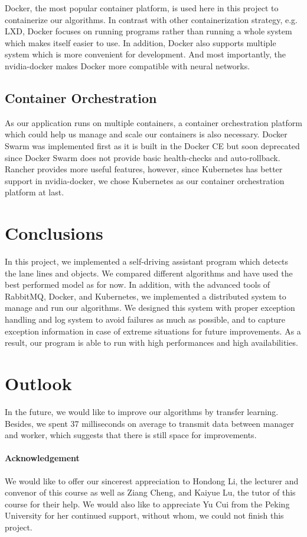 \documentclass[runningheads]{llncs}
\begin{document}
Docker, the most popular container platform, is used here 
in this project to containerize our algorithms. In contrast 
with other containerization strategy, e.g. LXD, Docker 
focuses on running programs rather than running a whole 
system which makes itself easier to use. In addition, 
Docker also supports multiple system which is more 
convenient for development. And most importantly, the 
nvidia-docker makes Docker more compatible with neural 
networks.

\subsection{Container Orchestration}
As our application runs on multiple containers, a container 
orchestration platform which could help us manage and scale 
our containers is also necessary. Docker Swarm was 
implemented first as it is built in the Docker CE but soon 
deprecated since Docker Swarm does not provide basic 
health-checks and auto-rollback. Rancher provides more 
useful features, however, since Kubernetes has better 
support in nvidia-docker, we chose Kubernetes as our 
container orchestration platform at last.


\section{Conclusions}
In this project, we implemented a self-driving assistant 
program which detects the lane lines and objects. We 
compared different algorithms and have used the best performed 
model as for now. In addition, with the advanced tools of 
RabbitMQ, Docker, and Kubernetes, we implemented a 
distributed system to manage and run our algorithms. We 
designed this system with proper exception handling and log 
system to avoid failures as much as possible, and to 
capture exception information in case of extreme situations 
for future improvements. As a result, our program is able 
to run with high performances and high availabilities. 

\section{Outlook}
In the future, we would like to improve our algorithms by 
transfer learning. Besides, we spent 37 milliseconds on 
average to transmit data between manager and worker, which 
suggests that there is still space for improvements. 

\paragraph{Acknowledgement}
We would like to offer our sincerest appreciation to 
Hondong Li, the lecturer and convenor of this course as 
well as Ziang Cheng, and Kaiyue Lu, the tutor of this 
course for their help. We would also like to appreciate 
Yu Cui from the Peking University for her continued support, 
without whom, we could not finish this project. 
\end{document}
